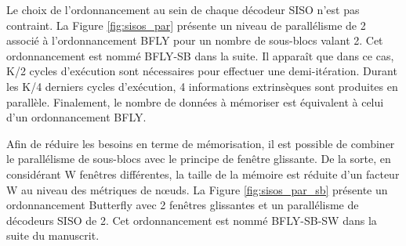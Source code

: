 Le choix de l'ordonnancement au sein de chaque décodeur SISO n'est pas contraint. La Figure \ref{fig:sisos_par} présente un niveau de 
parallélisme de 2 associé à l'ordonnancement BFLY pour un nombre de sous-blocs valant 2. Cet ordonnancement est nommé 
BFLY-SB dans la suite. Il apparaît que dans ce cas, K/2 cycles d'exécution sont nécessaires pour effectuer une demi-itération. 
Durant les K/4 derniers cycles d'exécution, 4 informations extrinsèques sont produites en parallèle. Finalement, le nombre de
données à mémoriser est équivalent à celui d'un ordonnancement BFLY.

Afin de réduire les besoins en terme de mémorisation, il est possible de combiner le parallélisme de sous-blocs avec le principe 
de fenêtre glissante. De la sorte, en considérant W fenêtres différentes, la taille de la mémoire est réduite d'un 
facteur W au niveau des métriques de nœuds. La Figure \ref{fig:sisos_par_sb} présente un ordonnancement Butterfly avec 
2 fenêtres glissantes et un parallélisme de décodeurs SISO de 2. Cet ordonnancement est nommé BFLY-SB-SW dans la suite
du manuscrit.


